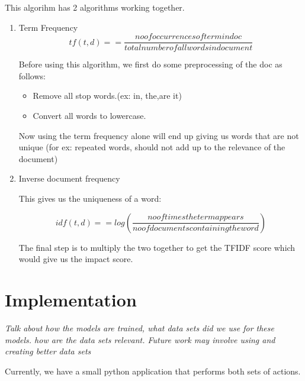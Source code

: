 \documentclass{article}
\begin{document}
This algorihm has 2 algorithms working together.
\begin{enumerate}
\item {Term Frequency}
\[tf(t,d) =  = \frac{no of occurrences of term in doc }{total number of all words in document}\]


Before using this algorithm, we first do some preprocessing of the doc as follows:
\begin{itemize}
\item {Remove all stop words.(ex: in, the,are it)}
\item {Convert all words to lowercase.}
\end {itemize}
Now using the term frequency alone will end up giving us words that are not unique (for ex: repeated words, should not add up to the relevance of the document)

\item Inverse document frequency

 This gives us the uniqueness of a word:

 \[idf(t,d) =  = log(\frac{no of times the term appears }{no of documents containing the word})\]

The final step is to multiply the two together to get the TFIDF score which would give us the impact score.
\end{enumerate}


\maketitle
\section{Implementation} %
 \textit{Talk about how the models are trained, what data sets did we use for these models. how are the data sets relevant. Future work may involve using and creating better data sets}

Currently, we have a small python application that performs both sets of actions. 
 \maketitle
\end{document}
